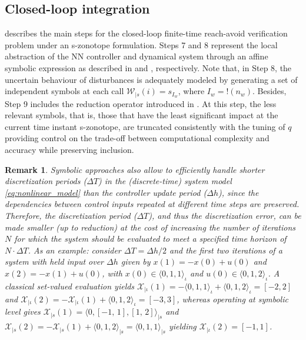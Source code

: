 \documentclass[journal]{IEEEtran}
\newtheorem{myremark}{Remark}
\begin{document}

\subsection{Closed-loop integration}

 describes the main steps for the closed-loop finite-time reach-avoid verification problem under an s-zonotope formulation. Steps 7 and 8 represent the local abstraction of the NN controller and dynamical system  through an affine symbolic expression as described in  and , respectively. Note that, in Step 8, the uncertain behaviour of disturbances is adequately modeled by  generating a set of  independent symbols at each call $\mathcal{W}_{|s}(i) = s_{I_{w}}$, where $I_w = !(n_w)$. Besides, Step 9 includes the reduction operator introduced in . At this step, the less relevant symbols, that is, those that have the least significant impact at the current time instant s-zonotope,  are truncated consistently with the tuning of $q$ providing control on the trade-off between computational complexity and accuracy while preserving inclusion. 

\begin{myremark} \label{rem:discrete_time}
Symbolic approaches also allow to efficiently handle shorter discretization periods ($\Delta T$) in the (discrete-time) system model \eqref{eq:nonlinear_model} than the controller update period ($\Delta h$), since the dependencies between control inputs repeated at different time steps are preserved. Therefore, the discretization period ($\Delta T$), and thus the discretization error,  can be made smaller (up to reduction) at the cost of increasing the number of iterations $N$ for which the system should be evaluated  to meet a specified time horizon of $N \cdot \Delta T$. As an example: consider $\Delta T = \Delta h/2$ and the first two iterations of a system with held input over $\Delta h$ given by $x(1) = -x(0) + u(0)$ and $x(2) = -x(1) + u(0)$, with  $x(0) \in  \langle 0,1,1\rangle_{\iota}$ and $u(0) \in \langle 0,1,2\rangle _{\iota}$. A classical set-valued evaluation yields $\mathcal{X}_{|\iota}(1)  = - \langle 0,1,1\rangle _{\iota} +  \langle 0,1,2\rangle _{\iota} = [-2,2]$ and $\mathcal{X}_{|\iota}(2) = -\mathcal{X}_{|\iota}(1) + \langle 0,1,2\rangle _{\iota} = [-3,3]$, whereas operating at symbolic level gives $\mathcal{X}_{|s}(1) = \langle 0,[-1, \, 1],[1, \, 2]\rangle_{|s}$ and $\mathcal{X}_{|s}(2) = -\mathcal{X}_{|s}(1) + \langle 0,1,2\rangle_{|s} = \langle 0,1,1\rangle_{|s}$ yielding $\mathcal{X}_{|\iota}(2) =[-1, 1]$.
\end{myremark}
\end{document}
